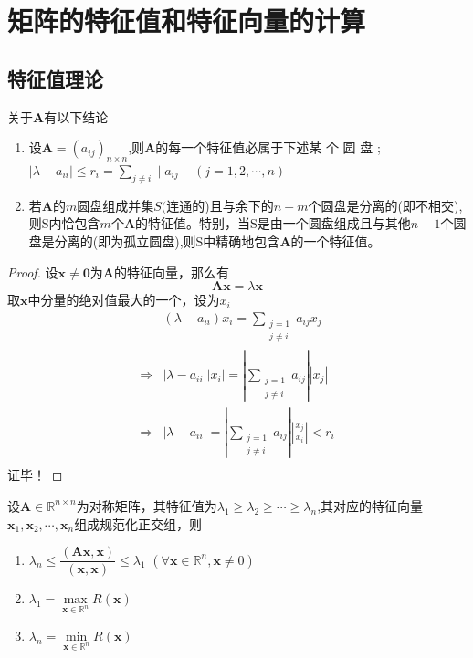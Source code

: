 \section{矩阵的特征值和特征向量的计算}
\subsection{特征值理论}
\begin{theorem}[Gerschgorin圆盘定理]
关于$\boldsymbol{A}$有以下结论
\begin{enumerate}
    \item 设$\boldsymbol{A}=(a_{ij})_{n\times n}$,则$\boldsymbol{A}$的每一个特征值必属于下述某 个 圆 盘 ; $\mid \lambda - a_{ii}\mid \leq r_{i}= \sum _{j\neq i}\mid a_{ij}\mid$ $( j= 1, 2, \cdots , n)$
    \item 若$\boldsymbol{A}$的$m$圆盘组成并集$S($连通的)且与余下的$n-m$个圆盘是分离的(即不相交),则S内恰包含$m$个$\boldsymbol{A}$的特征值。特别，当S是由一个圆盘组成且与其他$n-1$个圆盘是分离的(即为孤立圆盘),则S中精确地包含$\boldsymbol{A}$的一个特征值。
\end{enumerate}
\end{theorem}
\begin{proof}
    设$\boldsymbol{x}\neq \boldsymbol{0}$为$\boldsymbol{A}$的特征向量，那么有
    \[
        \boldsymbol{Ax} = \lambda\boldsymbol{x}
    \]
    取$\boldsymbol{x}$中分量的绝对值最大的一个，设为$x_{i}$
    \[
        \begin{aligned}
            &(\lambda -a_{ii})x_{i} = \sum_{\substack{j = 1\\j\neq i}}a_{ij}x_{j}\\
            \Rightarrow & |\lambda -a_{ii}||x_{i}| = |\sum_{\substack{j = 1\\j\neq i}}a_{ij}||x_{j}|  \\
            \Rightarrow & |\lambda -a_{ii}| = |\sum_{\substack{j = 1\\j\neq i}}a_{ij}|\left|\frac{x_{j}}{x_{i}}\right|< r_{i}  \\
        \end{aligned}
    \]
    证毕！
\end{proof}
\begin{theorem}
    设$\boldsymbol{A}\in\mathbb{R}^{n\times n}$为对称矩阵，其特征值为$\lambda_1\geq\lambda_2\geq\cdots\geq\lambda_n$,其对应的特征向量 $\boldsymbol{x}_1, \boldsymbol{x}_2, \cdots , \boldsymbol{x}_n$组成规范化正交组，则
\begin{enumerate}
    \item  $\lambda _n\leq \dfrac {( \boldsymbol{A}\boldsymbol{x}, \boldsymbol{x}) }{( \boldsymbol{x}, \boldsymbol{x}) }\leq \lambda _1$ $( \forall \boldsymbol{x}\in \mathbb{R} ^n, \boldsymbol{x}\neq 0)$
    \item $\lambda_1=\max\limits_{\boldsymbol{x}\in\mathbb{R}^n}R(\boldsymbol{x})$
    \item $\lambda_n=\min\limits_{\boldsymbol{x}\in\mathbb{R}^n}R(\boldsymbol{x})$
\end{enumerate}
\end{theorem}

